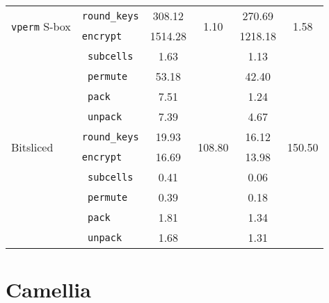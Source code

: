\begin{table}[!htbp]
\begin{tabular}{llcccc}
        \midrule
        \multirow{2}{*}{\texttt{vperm} S-box} & \texttt{round\_keys} & 308.12 & \multirow{2}{*}{1.10} & 270.69 & \multirow{2}{*}{1.58} \\
                                              & \texttt{encrypt} & 1514.28 & & 1218.18 & \\
        \cmidrule(lr){2-2}
                                              & \texttt{ subcells} & 1.63 & & 1.13 & \\
                                              & \texttt{ permute} & 53.18 & & 42.40 & \\
                                              & \texttt{ pack} & 7.51 & & 1.24 & \\
                                              & \texttt{ unpack} & 7.39 & & 4.67 & \\
        \midrule
        \multirow{2}{*}{Bitsliced} & \texttt{round\_keys} & 19.93 & \multirow{2}{*}{108.80} & 16.12 & \multirow{2}{*}{150.50} \\
                                   & \texttt{encrypt} & 16.69 & & 13.98 & \\
        \cmidrule(lr){2-2}
                                   & \texttt{ subcells} & 0.41 & & 0.06 & \\
                                   & \texttt{ permute} & 0.39 & & 0.18 & \\
                                   & \texttt{ pack} & 1.81 & & 1.34 & \\
                                   & \texttt{ unpack} & 1.68 & & 1.31 & \\
        \bottomrule
    \end{tabular}
\end{table}

\section{Camellia}


